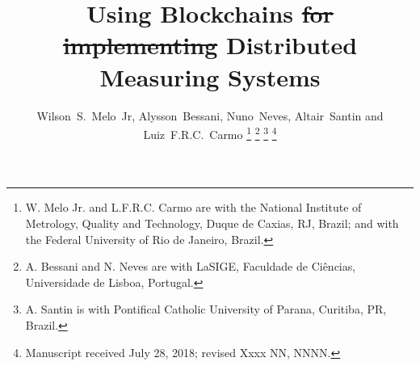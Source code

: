 \documentclass[journal]{IEEEtran}
\providecommand{\DIFadd}[1]{{\protect\color{blue}\uwave{#1}}} %
\providecommand{\DIFdel}[1]{{\protect\color{red}\sout{#1}}}                      %
\providecommand{\DIFaddbegin}{} %
\providecommand{\DIFaddend}{} %
\providecommand{\DIFdelbegin}{} %
\providecommand{\DIFdelend}{} %
\begin{document}

\title{Using Blockchains \DIFdelbegin \DIFdel{for implementing }\DIFdelend \DIFaddbegin \DIFadd{to implement }\DIFaddend Distributed Measuring Systems}

\author{
\and
{}
\and
{}
}

\author{Wilson~S.~Melo~Jr, %
        Alysson~Bessani, %
        Nuno~Neves, %
        Altair~Santin
        and Luiz~F.R.C.~Carmo
\thanks{W. Melo Jr. and L.F.R.C. Carmo are with the National Institute of Metrology, Quality and Technology, Duque de Caxias, RJ, Brazil; and with the Federal University of Rio de Janeiro, Brazil.}%
\DIFdelbegin %
\DIFdelend \DIFaddbegin \thanks{A. Bessani and N. Neves are with LaSIGE, Faculdade de Ci\^encias, Universidade de Lisboa, Portugal.}\DIFaddend %
\thanks{A. Santin is with Pontifical Catholic University of Parana, Curitiba, PR, Brazil.}%
\thanks{Manuscript received July 28, 2018; revised Xxxx NN, NNNN.}}
\end{document}

